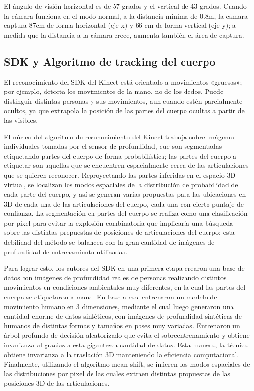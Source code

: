 El ángulo de visión horizontal es de 57 grados y el vertical de 43 grados. Cuando la cámara  funciona en el modo normal, a la distancia mínima de 0.8m, la cámara captura 87cm de forma horizontal (eje x) y 66 cm de forma vertical (eje y); a medida que la distancia a la cámara crece, aumenta también el área de captura.


\subsection{SDK y Algoritmo de tracking del cuerpo}

El reconocimiento del SDK del Kinect está orientado a movimientos «gruesos»; por ejemplo, detecta los movimientos de la mano, no de los dedos. Puede distinguir distintas personas y sus movimientos, aun cuando estén parcialmente ocultos, ya que extrapola la posición de las partes del cuerpo ocultas a partir de las visibles. 

El núcleo del algoritmo de reconocimiento del Kinect trabaja sobre imágenes individuales tomadas por el sensor de profundidad, que son segmentadas etiquetando partes del cuerpo de forma probabilística; las partes del cuerpo a etiquetar son aquellas que se encuentren espacialmente cerca de las articulaciones que se quieren reconocer. Reproyectando las partes inferidas en el espacio 3D virtual, se localizan los modos espaciales de la distribución de probabilidad de cada parte del cuerpo, y así se generan varias propuestas para las ubicaciones en 3D  de cada una de las articulaciones del cuerpo, cada una con cierto puntaje de confianza. La segmentación en partes del cuerpo se realiza como una clasificación por pixel para evitar la explosión combinatoria que implicaría una búsqueda sobre las distintas propuestas de posiciones de articulaciones del cuerpo; esta debilidad del método se balancea con la gran cantidad de imágenes de profundidad de entrenamiento utilizadas. 

Para lograr esto, los autores del SDK en una primera etapa crearon una base de datos con imágenes de profundidad reales de personas realizando distintos movimientos en condiciones ambientales muy diferentes, en la cual las partes del cuerpo se etiquetaron a mano. En base a eso, entrenaron un modelo de movimiento humano en 3 dimensiones, mediante el cual luego generaron una cantidad enorme de datos sintéticos, con imágenes de profundidad sintéticas de humanos de distintas formas y tamaños en poses muy variadas. Entrenaron un árbol profundo de decisión aleatorizado que evita el sobreentrenamiento y obtiene invarianza al gracias a esta gigantesca cantidad de datos. Esta manera, la técnica obtiene invarianza a la traslación 3D manteniendo la eficiencia computacional. Finalmente, utilizando el algoritmo mean-shift, se infieren los modos espaciales de las distribuciones por pixel de las cuales extraen distintas propuestas de las posiciones 3D de las articulaciones. 

